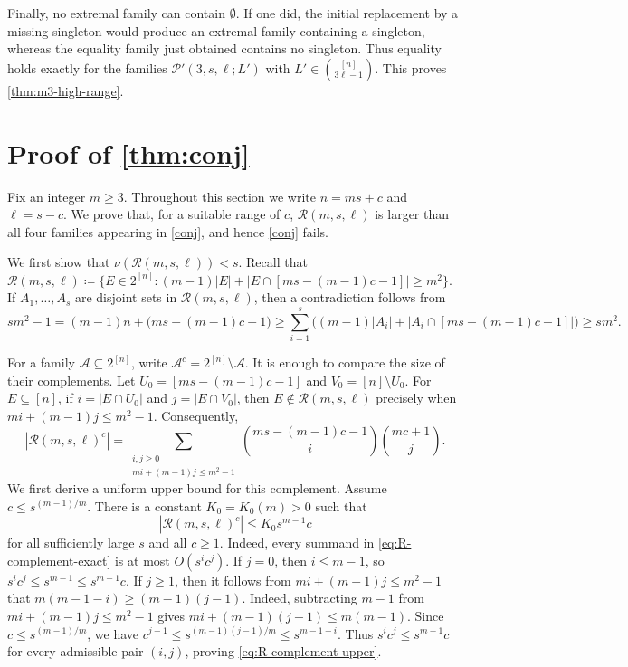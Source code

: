 \documentclass[10pt,a4paper]{article}
\numberwithin{equation}{section}
\theoremstyle{definition}
\begin{document}
Finally, no extremal family can contain $\emptyset$.
If one did, the initial replacement by a missing singleton would produce an extremal family containing a singleton, whereas the equality family just obtained contains no singleton.
Thus equality holds exactly for the families $\mathcal P'(3,s,\ell;L')$ with $L'\in\binom{[n]}{3\ell-1}$.
This proves \cref{thm:m3-high-range}.


\section{Proof of \cref{thm:conj}}
\label{sec:counterexample}

Fix an integer $m\ge3$.
Throughout this section we write $n=ms+c$ and $\ell=s-c$.
We prove that, for a suitable range of $c$, $\mathcal R(m,s,\ell)$ is larger than all four families appearing in \cref{conj}, and hence \cref{conj} fails.

We first show that $\nu(\mathcal R(m,s,\ell))<s$.
Recall that $\mathcal R(m,s,\ell)\coloneqq\{E\in 2^{[n]}:(m-1)|E|+|E\cap[ms-(m-1)c-1]|\ge m^2\}$.
If $A_1,\ldots,A_s$ are disjoint sets in $\mathcal R(m,s,\ell)$, then a contradiction follows from
\[
        sm^2-1=(m-1)n+\bigl(ms-(m-1)c-1\bigr)\ge\sum_{i=1}^s \bigl((m-1)|A_i|+|A_i\cap[ms-(m-1)c-1]|\bigr)\ge sm^2.
\]

For a family $\mathcal A\subseteq2^{[n]}$, write $\mathcal A^c=2^{[n]}\setminus\mathcal A$.
It is enough to compare the size of their complements.
Let $U_0=[ms-(m-1)c-1]$ and $V_0=[n]\setminus U_0$.
For $E\subseteq[n]$, if $i=|E\cap U_0|$ and $j=|E\cap V_0|$, then $E\notin\mathcal R(m,s,\ell)$ precisely when $mi+(m-1)j\le m^2-1$.
Consequently,
\begin{equation}\label{eq:R-complement-exact}
        |\mathcal R(m,s,\ell)^c|
        =
        \sum_{\substack{i,j\ge0\\ mi+(m-1)j\le m^2-1}}
        \binom{ms-(m-1)c-1}{i}\binom{mc+1}{j}.
\end{equation}
We first derive a uniform upper bound for this complement.
Assume $c\le s^{(m-1)/m}$.
There is a constant $K_0=K_0(m)>0$ such that
\begin{equation}\label{eq:R-complement-upper}
        |\mathcal R(m,s,\ell)^c|
        \le K_0s^{m-1}c
\end{equation}
for all sufficiently large $s$ and all $c\ge1$.
Indeed, every summand in \eqref{eq:R-complement-exact} is at most $O(s^ic^j)$.
If $j=0$, then $i\le m-1$, so $s^ic^j\le s^{m-1}\le s^{m-1}c$.
If $j\ge1$, then it follows from $mi+(m-1)j\le m^2-1$ that $m(m-1-i)\ge(m-1)(j-1)$.
Indeed, subtracting $m-1$ from $mi+(m-1)j\le m^2-1$ gives $mi+(m-1)(j-1)\le m(m-1)$.
Since $c\le s^{(m-1)/m}$, we have $c^{j-1} \le s^{(m-1)(j-1)/m} \le s^{m-1-i}$.
Thus $s^ic^j\le s^{m-1}c$ for every admissible pair $(i,j)$, proving \eqref{eq:R-complement-upper}.
\end{document}
